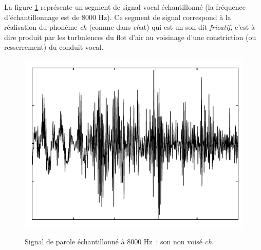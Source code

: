 \begin{example}[Parole]
La figure \ref{fig:figspeech} repr\'esente un segment de signal
vocal \'echantillonn\'e (la fr\'equence d'\'echantillonnage est de 8000
Hz). Ce segment de signal correspond \`a la r\'ealisation du
phon\`eme \emph{ch} (comme dans \emph{ch}at) qui est un son
dit \emph{fricatif}, c'est-\`a-dire produit par les turbulences du
flot d'air au voisinage d'une constriction (ou resserrement) du
conduit vocal.
\begin{figure}
  \centering
  \includegraphics[width=\textwidth]{Figures/phrase}\\
  \caption{Signal de parole \'echantillonn\'e \`a $8000$ Hz~:
 son non vois\'e \emph{ch}.}\label{fig:figspeech}
\end{figure}
\end{example}

